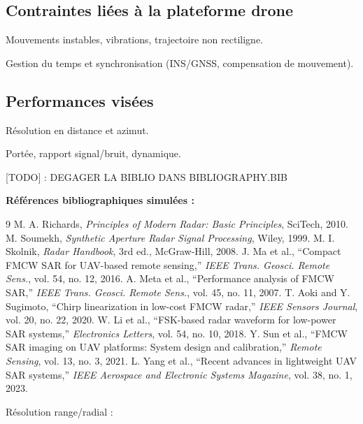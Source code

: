 \subsection{Contraintes liées à la plateforme drone}

Mouvements instables, vibrations, trajectoire non rectiligne.

Gestion du temps et synchronisation (INS/GNSS, compensation de mouvement).


\subsection{Performances visées}

Résolution en distance et azimut.

Portée, rapport signal/bruit, dynamique.


[TODO] : DEGAGER LA BIBLIO DANS BIBLIOGRAPHY.BIB

\bigskip
\noindent\textbf{Références bibliographiques simulées :}
\begin{thebibliography}{9}
 M. A. Richards, \textit{Principles of Modern Radar: Basic Principles}, SciTech, 2010.
 M. Soumekh, \textit{Synthetic Aperture Radar Signal Processing}, Wiley, 1999.
 M. I. Skolnik, \textit{Radar Handbook}, 3rd ed., McGraw-Hill, 2008.
 J. Ma et al., “Compact FMCW SAR for UAV-based remote sensing,” \textit{IEEE Trans. Geosci. Remote Sens.}, vol. 54, no. 12, 2016.
 A. Meta et al., “Performance analysis of FMCW SAR,” \textit{IEEE Trans. Geosci. Remote Sens.}, vol. 45, no. 11, 2007.
 T. Aoki and Y. Sugimoto, “Chirp linearization in low-cost FMCW radar,” \textit{IEEE Sensors Journal}, vol. 20, no. 22, 2020.
 W. Li et al., “FSK-based radar waveform for low-power SAR systems,” \textit{Electronics Letters}, vol. 54, no. 10, 2018.
 Y. Sun et al., “FMCW SAR imaging on UAV platforms: System design and calibration,” \textit{Remote Sensing}, vol. 13, no. 3, 2021.
 L. Yang et al., “Recent advances in lightweight UAV SAR systems,” \textit{IEEE Aerospace and Electronic Systems Magazine}, vol. 38, no. 1, 2023.
\end{thebibliography}




\newpage


Résolution range/radial :

